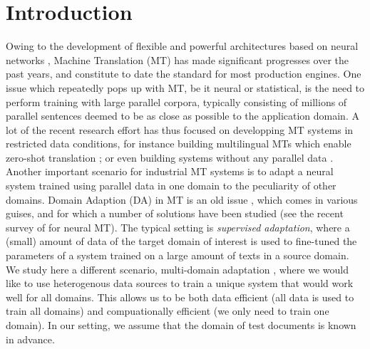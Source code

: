 \documentclass[11pt,a4paper]{article}
\begin{document}
\section{Introduction \label{sec:introduction}}
Owing to the development of flexible and powerful architectures based on neural networks \cite{Cho14properties,Bahdanau15learning,Ghering17convolutional,Vaswani17attention}, Machine Translation (MT) has made significant progresses over the past years, and constitute to date the standard for most production engines. One issue which repeatedly pops up with MT, be it neural or statistical, is the need to perform training with large parallel corpora, typically consisting of millions of parallel sentences deemed to be as close as possible to the application domain. A lot of the recent research effort has thus focused on developping MT systems in restricted data conditions, for instance building multilingual MTs which enable zero-shot translation \cite{Firat16multiway,Ha16towards,Johnson17google}; or even building systems without any parallel data \cite{Artetxe18unsupervised,Lample18unsupervised}.
Another important scenario for industrial MT systems is to adapt a neural system trained using parallel data in one domain to the peculiarity of other domains. Domain Adaption (DA) in MT is an old issue \cite{Foster07mixture,Axelrod11domain}, which comes in various guises, and for which a number of solutions have been studied (see the recent survey of \cite{Chu18asurvey} for neural MT). The typical setting is \emph{supervised adaptation}, where a (small) amount of data of the target domain of interest is used to fine-tuned the parameters of a system trained on a large amount of texts in a source domain. We study here a different scenario, multi-domain adaptation \cite{Sennrich13multidomain,Farajian17multidomain}, where we would like to use heterogenous data sources to train a unique system that would work well for all domains. This allows us to be both data efficient (all data is used to train all domains) and compuationally efficient (we only need to train one domain). In our setting, we assume that the domain of test documents is known in advance.
\end{document}
